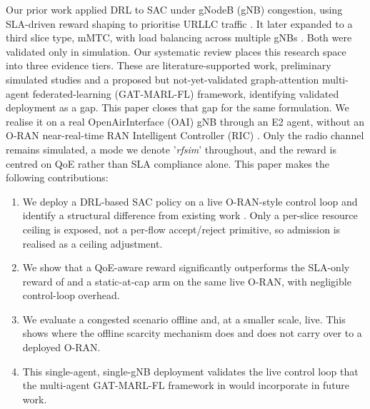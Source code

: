 \documentclass[10pt]{article}
\begin{document}
Our prior work applied DRL to SAC under gNodeB (gNB) congestion, using
SLA-driven reward shaping to prioritise URLLC traffic
\cite{mecon-paper1}. It later expanded to a third slice type, mMTC,
with load balancing across multiple gNBs \cite{icraie-paper2}. Both
were validated only in simulation. Our systematic review
\cite{survey-paper3} places this research space into three evidence
tiers. These are literature-supported work, preliminary simulated
studies and a proposed but not-yet-validated graph-attention
multi-agent federated-learning (GAT-MARL-FL) framework, identifying validated deployment as a gap.
This paper closes that gap for the same formulation. We realise it on
a real OpenAirInterface (OAI) gNB through an E2 agent, without an
O-RAN near-real-time RAN Intelligent Controller (RIC)
\cite{oran-e2ap}. Only the radio channel remains simulated, a mode we
denote '\textit{rfsim}' throughout, and the reward is centred on QoE rather than
SLA compliance alone. This paper makes the following
contributions:
\begin{enumerate}[itemsep=1pt,topsep=2pt,parsep=0pt,partopsep=0pt]
\item We deploy a DRL-based SAC policy on a live O-RAN-style control
loop and identify a structural difference from existing work
\cite{mecon-paper1,icraie-paper2}. Only a per-slice resource ceiling
is exposed, not a per-flow accept/reject primitive, so admission is
realised as a ceiling adjustment.
\item We show that a QoE-aware reward significantly outperforms the
SLA-only reward of \cite{mecon-paper1,icraie-paper2} and a
static-at-cap arm on the same live O-RAN, with negligible
control-loop overhead.
\item We evaluate a congested scenario offline and, at a smaller
scale, live. This shows where the offline scarcity mechanism does
and does not carry over to a deployed O-RAN.
\item This single-agent, single-gNB deployment validates the live
control loop that the multi-agent GAT-MARL-FL framework in
\cite{survey-paper3} would incorporate in future work.
\end{enumerate}
\end{document}
